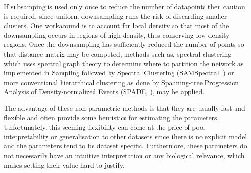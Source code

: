 
If subsamping is used only once to reduce the number of datapoints then 
caution is required, since uniform downsampling runs the risk of discarding smaller clusters.
One workaround is to account for local density so that most of the downsampling occurs in regions of high-density,
thus conserving low density regions.
Once the downsampling has sufficiently reduced the number of points so that distance matrix may be computed,
methods such as, spectral clustering which uses spectral graph theory to determine where to partition the network
as implemented in Sampling followed by Spectral Clustering (SAMSpectral, \citet{Zare:2010cw}) or more conventional hierarchical clustering
as done by Spanning-tree Progression Analysis of Density-normalized Events (SPADE, \citet{Simonds:2011jh}), may be applied.

The advantage of these non-parametric methods is that they are usually fast and flexible and often provide some heuristics for estimating the parameters.  
Unfortunately, this seeming flexibility can come at the price of poor interpretability or generalisation to other datasets since there is no explicit model
and the parameters tend to be dataset specific.
Furthermore, these parameters do not necessarily have an intuitive interpretation or any biological relevance, which makes setting their value hard to justify.



